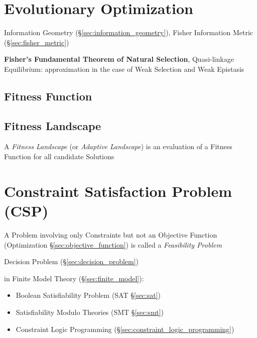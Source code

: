 \section{Evolutionary Optimization}\label{sec:evolutionary_optimization}

\fist Information Geometry (\S\ref{sec:information_geometry}), Fisher
Information Metric (\S\ref{sec:fisher_metric})

\fist \textbf{Fisher's Fundamental Theorem of Natural Selection},
Quasi-linkage Equilibrium: approximation in the case of Weak Selection
and Weak Epistasis %



\subsection{Fitness Function}\label{sec:fitness_function}

\subsection{Fitness Landscape}\label{sec:fitness_landscape}

A \emph{Fitness Landscape} (or \emph{Adaptive Landscape}) is an
evaluation of a Fitness Function for all candidate Solutions %



\section{Constraint Satisfaction Problem (CSP)}
\label{sec:constraint_satisfaction}

A Problem involving only Constraints but not an Objective Function
(Optimization \S\ref{sec:objective_function}) is called a \emph{Feasibility
  Problem}

\fist Decision Problem (\S\ref{sec:decision_problem})

in Finite Model Theory (\S\ref{sec:finite_model}):
\begin{itemize}
  \item Boolean Satisfiability Problem (SAT \S\ref{sec:sat})
  \item Satisfiability Modulo Theories (SMT \S\ref{sec:smt})
  \item Constraint Logic Programming (\S\ref{sec:constraint_logic_programming})
\end{itemize}


